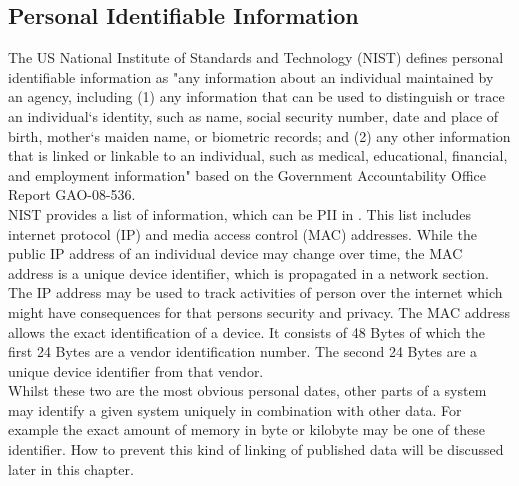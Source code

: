     \subsection{Personal Identifiable Information}
        \label{subsec:related:pii}
        The US National Institute of Standards and Technology (NIST) defines personal identifiable information as "any information about an individual maintained by an agency, including (1) any information that can be used to distinguish or trace an individual‘s identity, such as name, social security number, date and place of birth, mother‘s maiden name, or biometric records; and (2) any other information that is linked or linkable to an individual, such as medical, educational, financial, and employment information"\cite{mccallister_guide_2010} based on the Government Accountability Office Report GAO-08-536\cite{government_accountability_office_privacy_2008}.\\
        NIST provides a list of information, which can be PII in \cite{mccallister_guide_2010}. This list includes internet protocol (IP) and media access control (MAC) addresses. While the public IP address of an individual device may change over time, the MAC address is a unique device identifier, which is propagated in a network section.
        The IP address may be used to track activities of person over the internet which might have consequences for that persons security and privacy. 
        The MAC address allows the exact identification of a device. It consists of 48 Bytes of which the first 24 Bytes are a vendor identification number. The second 24 Bytes are a unique device identifier from that vendor.\\
        Whilst these two are the most obvious personal dates, other parts of a system may identify 
        a given system uniquely in combination with other data. For example the exact amount of memory in byte or kilobyte may be one of these identifier. How to prevent this kind of linking of published data will be discussed later in this chapter.\\
        
